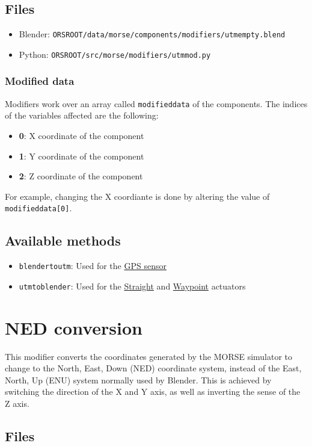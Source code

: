 \documentclass[twoside,a4paper,10pt]{report}
\newcommand{\dokutitlelevelone}[1]{\chapter{#1}}
\newcommand{\dokutitleleveltwo}[1]{\section{#1}}
\newcommand{\dokutitleleveltree}[1]{\subsection{#1}}
\newcommand{\dokubold}[1]{\textbf{#1}}
\newcommand{\dokumonospace}[1]{\texttt{#1}}
\newcommand{\dokuitem}{\item}
\begin{document}
\dokutitleleveltwo{Files}
\label{45b963397aa40d4a0063e0d85e4fe7a1}%

\begin{itemize}
\dokuitem  Blender: \dokumonospace{{\textdollar}ORS{\textunderscore}ROOT/data/morse/components/modifiers/utm{\textunderscore}empty.blend}
\dokuitem  Python: \dokumonospace{{\textdollar}ORS{\textunderscore}ROOT/src/morse/modifiers/utm{\textunderscore}mod.py}
\end{itemize}

\dokutitleleveltree{Modified data}
\label{c1a1a093b7ca2545d0d88cac0ff8ccf6}%
Modifiers work over an array called \dokumonospace{modified{\textunderscore}data} of the components.
The indices of the variables affected are the following:


\begin{itemize}
\dokuitem  \dokubold{0}: X coordinate of the component
\dokuitem  \dokubold{1}: Y coordinate of the component
\dokuitem  \dokubold{2}: Z coordinate of the component
\end{itemize}

For example, changing the X coordiante is done by altering the value of \dokumonospace{modified{\textunderscore}data[0]}.


\dokutitleleveltwo{Available methods}
\label{a2d06dcb42bbd0519b19166fd7f36cea}%

\begin{itemize}
\dokuitem  \dokumonospace{blender{\textunderscore}to{\textunderscore}utm}: Used for the \hyperref[11648e4e66e7ed6a86cb7f1d0cf604fe]{ GPS sensor}
\dokuitem  \dokumonospace{utm{\textunderscore}to{\textunderscore}blender}: Used for the \hyperref[6990a54322d9232390a784c5c9247dd6]{ Straight} and \hyperref[f75862c2bd0040eb683048c313dcaaa8]{ Waypoint} actuators
\end{itemize}

\dokutitlelevelone{NED conversion}
\label{95cc2c00e60ea8d7ee8c566b6598de36}%
\label{f68daad189b2fffd0b8cab5e36ec9d96}%
This modifier converts the coordinates generated by the MORSE simulator to change to the North, East, Down (NED) coordinate system, instead of the East, North, Up (ENU) system normally used by Blender.
This is achieved by switching the direction of the X and Y axis, as well as inverting the sense of the Z axis.


\dokutitleleveltwo{Files}
\label{45b963397aa40d4a0063e0d85e4fe7a1}%
\end{document}
